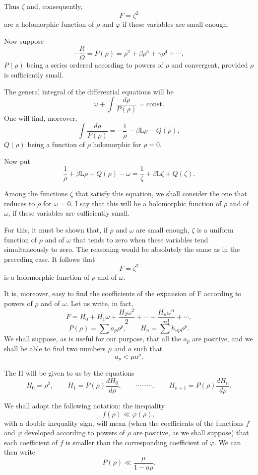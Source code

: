 \documentclass[11pt]{article}
\begin{document}
Thus $\zeta$ and, consequently,
\[
F=\zeta^2
\]
are a holomorphic function of $\rho$ and $\varphi$ if these variables are small enough.

Now suppose
\[
-\frac{R}{\Omega}=P(\rho)=\rho^2+\beta\rho^3+\gamma\rho^4+\cdots,
\]
$P(\rho)$ being a series ordered according to powers of $\rho$ and convergent, provided $\rho$ is sufficiently small.

The general integral of the differential equations will be
\[
\omega+\int\frac{d\rho}{P(\rho)}=\mathrm{const.}
\]
One will find, moreover,
\[
\int\frac{d\rho}{P(\rho)}=-\frac1\rho-\beta\mathrm L\rho-Q(\rho),
\]
$Q(\rho)$ being a function of $\rho$ holomorphic for $\rho=0$.

Now put
\begin{equation}\tag{5 bis}
\frac1\rho+\beta\mathrm L\rho+Q(\rho)-\omega
=\frac1\zeta+\beta\mathrm L\zeta+Q(\zeta).
\end{equation}

Among the functions $\zeta$ that satisfy this equation, we shall consider the one that reduces to $\rho$ for $\omega=0$. I say that this will be a holomorphic function of $\rho$ and of $\omega$, if these variables are sufficiently small.

For this, it must be shown that, if $\rho$ and $\omega$ are small enough, $\zeta$ is a uniform function of $\rho$ and of $\omega$ that tends to zero when these variables tend simultaneously to zero. The reasoning would be absolutely the same as in the preceding case. It follows that
\[
F=\zeta^2
\]
is a holomorphic function of $\rho$ and of $\omega$.

It is, moreover, easy to find the coefficients of the expansion of F according to powers of $\rho$ and of $\omega$. Let us write, in fact,
\[
F=H_0+H_1\omega+\frac{H_2\omega^2}{2}+\cdots+\frac{H_n\omega^n}{n!}+\cdots,
\]
\[
P(\rho)=\sum a_p\rho^p,
\qquad
H_n=\sum h_{np}\rho^p.
\]
We shall suppose, as is useful for our purpose, that all the $a_p$ are positive, and we shall be able to find two numbers $\mu$ and $a$ such that
\[
a_p<\mu a^p.
\]

The H will be given to us by the equations
\[
H_0=\rho^2,
\qquad
H_1=P(\rho)\frac{dH_0}{d\rho},
\qquad
\cdots\cdots\cdots,
\qquad
H_{n+1}=P(\rho)\frac{dH_n}{d\rho}.
\]

We shall adopt the following notation: the inequality
\[
f(\rho)\ll\varphi(\rho),
\]
with a double inequality sign, will mean (when the coefficients of the functions $f$ and $\varphi$ developed according to powers of $\rho$ are positive, as we shall suppose) that each coefficient of $f$ is smaller than the corresponding coefficient of $\varphi$. We can then write
\[
P(\rho)\ll\frac{\mu}{1-a\rho}.
\]
\end{document}
